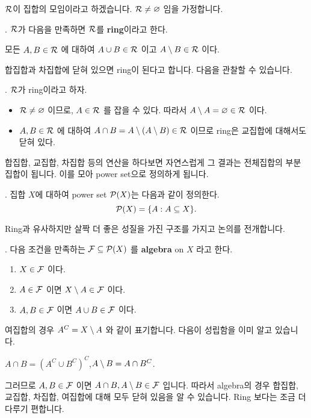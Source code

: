\(\mathcal{R}\)이 집합의 모임이라고 하겠습니다. \(\mathcal{R} \neq \varnothing\) 임을 가정합니다.

.  \(\mathcal{R}\)가 다음을 만족하면 \(\mathcal{R}\)를 \textbf{ring}이라고 한다.
\begin{center}
    모든 \(A, B \in \mathcal{R}\) 에 대하여 \(A \cup B \in \mathcal{R}\) 이고 \(A \setminus B \in \mathcal{R}\) 이다.
\end{center}

합집합과 차집합에 닫혀 있으면 ring이 된다고 합니다. 다음을 관찰할 수 있습니다.

\prop. \(\mathcal{R}\)가 ring이라고 하자.
\begin{itemize}
    \item \(\mathcal{R}\neq \varnothing\) 이므로, \(A \in \mathcal{R}\) 를 잡을 수 있다. 따라서 \(A \setminus A = \varnothing \in \mathcal{R}\) 이다.
    \item \(A, B \in \mathcal{R}\) 에 대하여 \(A \cap B = A \setminus (A \setminus B) \in \mathcal{R}\) 이므로 ring은 교집합에 대해서도 닫혀 있다.
\end{itemize}

합집합, 교집합, 차집합 등의 연산을 하다보면 자연스럽게 그 결과는 전체집합의 부분집합이 됩니다. 이를 모아 power set으로 정의하게 됩니다.

.  집합 \(X\)에 대하여 power set \(\mathcal{P}(X)\)는 다음과 같이 정의한다.
\[
    \mathcal{P}(X) = \{A : A \subseteq X\}.
\]

Ring과 유사하지만 살짝 더 좋은 성질을 가진 구조를 가지고 논의를 전개합니다.

.  다음 조건을 만족하는 \(\mathcal{F} \subseteq \mathcal{P}(X)\) 를 \textbf{algebra} on \(X\) 라고 한다.
\begin{enumerate}
    \item \(X \in \mathcal{F}\) 이다.
    \item \(A \in \mathcal{F}\) 이면 \(X \setminus A \in \mathcal{F}\) 이다.
    \item \(A, B \in \mathcal{F}\) 이면 \(A\cup B \in \mathcal{F}\) 이다.
\end{enumerate}

\rmk 여집합의 경우 \(A^C = X \setminus A\) 와 같이 표기합니다. 다음이 성립함을 이미 알고 있습니다.
\begin{center}
    \(A \cap B = (A^C \cup B^C)^C\),\quad \(A\setminus B = A \cap B^C\).
\end{center}

그러므로 \(A, B \in \mathcal{F}\) 이면 \(A \cap B, A \setminus B \in \mathcal{F}\) 입니다. 따라서 algebra의 경우 합집합, 교집합, 차집합, 여집합에 대해 모두 닫혀 있음을 알 수 있습니다. Ring 보다는 조금 더 다루기 편합니다.

